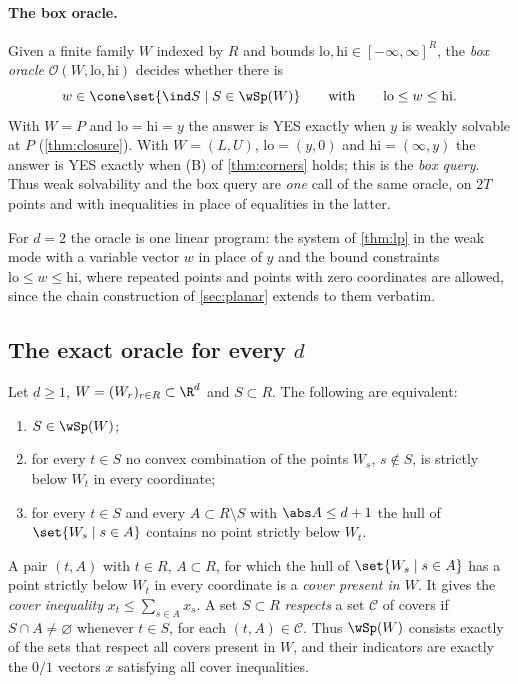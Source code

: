 \paragraph{The box oracle.} Given a finite family $W$ indexed by $R$ and bounds $\mathrm{lo},\mathrm{hi}\in[-\infty,\infty]^R$, the \emph{box oracle} $\mathcal O(W,\mathrm{lo},\mathrm{hi})$ decides whether there is
\[
w\in\cone\set{\ind S\mid S\in\wSp(W)}\qquad\text{with}\qquad \mathrm{lo}\le w\le\mathrm{hi}.
\]
With $W=P$ and $\mathrm{lo}=\mathrm{hi}=y$ the answer is YES exactly when $y$ is weakly solvable at $P$ (\cref{thm:closure}). With $W=(L,U)$, $\mathrm{lo}=(y,0)$ and $\mathrm{hi}=(\infty,y)$ the answer is YES exactly when (B) of \cref{thm:corners} holds; this is the \emph{box query}. Thus weak solvability and the box query are \emph{one} call of the same oracle, on $2T$ points and with inequalities in place of equalities in the latter.

\begin{remark}[$d=2$]\label{rem:oracle-planar}
For $d=2$ the oracle is one linear program: the system of \cref{thm:lp} in the weak mode with a variable vector $w$ in place of $y$ and the bound constraints $\mathrm{lo}\le w\le\mathrm{hi}$, where repeated points and points with zero coordinates are allowed, since the chain construction of \cref{sec:planar} extends to them verbatim.
\end{remark}

\subsection{The exact oracle for every $d$}

\begin{lemma}\label{lem:cover}
Let $d\ge1$, $W=(W_r)_{r\in R}\subset\R^d$ and $S\subset R$. The following are equivalent:
\begin{enumerate}[label=(\roman*)]
\item $S\in\wSp(W)$;
\item for every $t\in S$ no convex combination of the points $W_s$, $s\notin S$, is strictly below $W_t$ in every coordinate;
\item for every $t\in S$ and every $A\subset R\setminus S$ with $\abs A\le d+1$ the hull of $\set{W_s\mid s\in A}$ contains no point strictly below $W_t$.
\end{enumerate}
A pair $(t,A)$ with $t\in R$, $A\subset R$, for which the hull of $\set{W_s\mid s\in A}$ has a point strictly below $W_t$ in every coordinate is a \emph{cover present in $W$}. It gives the \emph{cover inequality} $x_t\le\sum_{s\in A}x_s$. A set $S\subset R$ \emph{respects} a set $\mathcal C$ of covers if $S\cap A\ne\varnothing$ whenever $t\in S$, for each $(t,A)\in\mathcal C$. Thus $\wSp(W)$ consists exactly of the sets that respect all covers present in $W$, and their indicators are exactly the $0/1$ vectors $x$ satisfying all cover inequalities.
\end{lemma}

